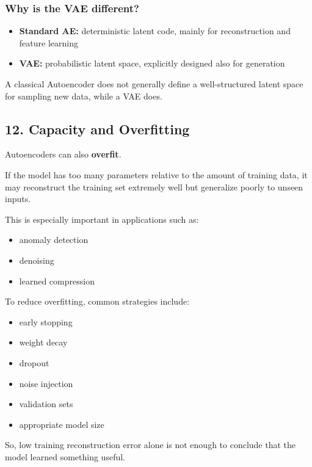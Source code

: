\documentclass[
  italian,
  11pt,
]{article}
\begin{document}
\subsubsection{Why is the VAE
different?}\label{why-is-the-vae-different}

\begin{itemize}
\item
  \textbf{Standard AE:} deterministic latent code, mainly for
  reconstruction and feature learning
\item
  \textbf{VAE:} probabilistic latent space, explicitly designed also for
  generation
\end{itemize}

A classical Autoencoder does not generally define a well-structured
latent space for sampling new data, while a VAE does.

\subsection{12. Capacity and
Overfitting}\label{capacity-and-overfitting}

Autoencoders can also \textbf{overfit}.

If the model has too many parameters relative to the amount of training
data, it may reconstruct the training set extremely well but generalize
poorly to unseen inputs.

This is especially important in applications such as:

\begin{itemize}
\item
  anomaly detection
\item
  denoising
\item
  learned compression
\end{itemize}

To reduce overfitting, common strategies include:

\begin{itemize}
\item
  early stopping
\item
  weight decay
\item
  dropout
\item
  noise injection
\item
  validation sets
\item
  appropriate model size
\end{itemize}

So, low training reconstruction error alone is not enough to conclude
that the model learned something useful.
\end{document}
